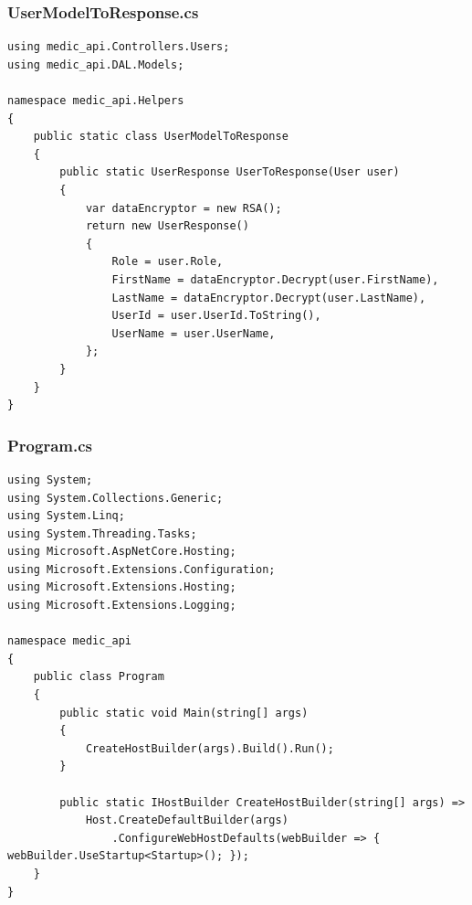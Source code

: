 \documentclass[12pt,a4paper]{article}
\begin{document}
	\subsubsection{UserModelToResponse.cs}
	\begin{lstlisting}
using medic_api.Controllers.Users;
using medic_api.DAL.Models;

namespace medic_api.Helpers
{
    public static class UserModelToResponse
    {
        public static UserResponse UserToResponse(User user)
        {
            var dataEncryptor = new RSA();
            return new UserResponse()
            {
                Role = user.Role,
                FirstName = dataEncryptor.Decrypt(user.FirstName),
                LastName = dataEncryptor.Decrypt(user.LastName),
                UserId = user.UserId.ToString(),
                UserName = user.UserName,
            };
        }
    }
}
	\end{lstlisting}
	\subsubsection{Program.cs}
	\begin{lstlisting}
using System;
using System.Collections.Generic;
using System.Linq;
using System.Threading.Tasks;
using Microsoft.AspNetCore.Hosting;
using Microsoft.Extensions.Configuration;
using Microsoft.Extensions.Hosting;
using Microsoft.Extensions.Logging;

namespace medic_api
{
    public class Program
    {
        public static void Main(string[] args)
        {
            CreateHostBuilder(args).Build().Run();
        }

        public static IHostBuilder CreateHostBuilder(string[] args) =>
            Host.CreateDefaultBuilder(args)
                .ConfigureWebHostDefaults(webBuilder => { webBuilder.UseStartup<Startup>(); });
    }
}
	\end{lstlisting}
\end{document}
